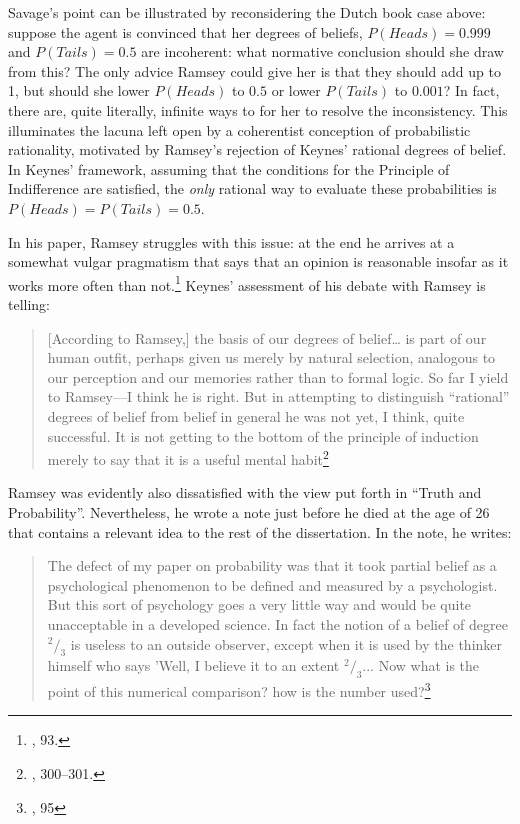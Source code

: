 Savage's point can be illustrated by reconsidering the Dutch book case
above: suppose the agent is convinced that her degrees of beliefs,
\(P(Heads) = 0.999\) and \(P(Tails) = 0.5\) are incoherent: what
normative conclusion should she draw from this? The only advice Ramsey
could give her is that they should add up to 1, but should she lower
\(P(Heads)\) to \(0.5\) or lower \(P(Tails)\) to \(0.001\)? In fact,
there are, quite literally, infinite ways to for her to resolve the
inconsistency. This illuminates the lacuna left open by a coherentist conception of probabilistic rationality, motivated by Ramsey's rejection of Keynes' rational degrees
of belief. In Keynes' framework, assuming that the conditions for the
Principle of Indifference are satisfied, the \emph{only} rational way to
evaluate these probabilities is \(P(Heads) = P(Tails) = 0.5\).

In his paper, Ramsey struggles with this issue: at the end he arrives at
a somewhat vulgar pragmatism that says that an opinion is reasonable
insofar as it works more often than not.\footnote{\cite{ramsey}, 93.} 
Keynes' assessment of his debate
with Ramsey is telling:

\begin{quote}
{[}According to Ramsey,{]} the basis of our degrees of belief\ldots{} is
part of our human outfit, perhaps given us merely by natural selection,
analogous to our perception and our memories rather than to formal
logic. So far I yield to Ramsey---I think he is right. But in attempting
to distinguish ``rational'' degrees of belief from belief in general he
was not yet, I think, quite successful. It is not getting to the bottom
of the principle of induction merely to say that it is a useful mental
habit\footnote{\cite{keynesbio}, 300--301.}
\end{quote}

Ramsey was evidently also dissatisfied with the view put forth in ``Truth and Probability''. Nevertheless, he wrote a note just before he died at the age of 26 that contains a relevant idea to the rest of the dissertation. In the note, he writes:

\begin{quote}
The defect of my paper on probability was that it took partial belief as a psychological phenomenon to be defined and measured by a psychologist. But this sort of psychology goes a very little way and would be quite unacceptable in a developed science. In fact the notion of a belief of degree $^2/_3$ is useless to an outside observer, except when it is used by the thinker himself who says 'Well, I believe it to an extent $^2/_3$... Now what is the point of this numerical comparison? how is the number used?\footnote{\cite{ramsey}, 95}
\end{quote}

